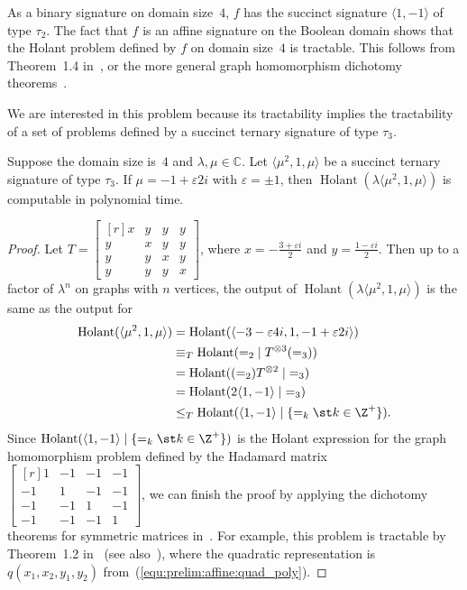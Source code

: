 \documentclass[11pt]{article}
\newcommand{\Holant}{\operatorname{Holant}}
\newcommand{\holant}[2]{\Holant(#1\mid #2)}
\begin{document}
As a binary signature on domain size~$4$,
$f$ has the succinct signature $\langle 1, -1 \rangle$ of type $\tau_2$.
The fact that $f$ is an affine signature on the Boolean domain shows that the Holant problem defined by $f$ on domain size~$4$ is tractable.
This follows from Theorem~1.4 in~\cite{CLX14},
or the more general graph homomorphism dichotomy theorems~\cite{GGJT10,CCL13}.

We are interested in this problem because its tractability implies the tractability of a set of problems defined by a succinct ternary signature of type $\tau_3$.

\begin{lemma} \label{lem:tractable:u^21u}
 Suppose the domain size is~$4$ and $\lambda, \mu \in \mathbb{C}$.
 Let $\langle \mu^2, 1, \mu \rangle$ be a succinct ternary signature of type $\tau_3$.
 If $\mu = -1 + \varepsilon 2 i$ with $\varepsilon = \pm 1$,
 then $\Holant(\lambda \langle \mu^2, 1, \mu \rangle)$ is computable in polynomial time.
\end{lemma}

\begin{proof}
 Let $T = \left[\begin{smallmatrix*}[r] x & y & y & y \\ y & x & y & y \\ y & y & x & y \\ y & y & y & x \end{smallmatrix*}\right]$,
 where $x = -\frac{3 + \varepsilon i}{2}$ and $y = \frac{1 - \varepsilon i}{2}$.
 Then up to a factor of $\lambda^n$ on graphs with $n$ vertices,
 the output of $\Holant(\lambda \langle \mu^2, 1, \mu \rangle)$ is the same as the output for
 \begin{align*}
  \Holant(\langle \mu^2, 1, \mu \rangle)
  &= \Holant(\langle -3 - \varepsilon 4 i, 1, -1 + \varepsilon 2 i \rangle)\\
  &\equiv_T \holant{{=}_2}{T^{\otimes 3} ({=}_3)}\\
  &= \holant{({=}_2) T^{\otimes 2}}{{=}_3}\\
  &= \holant{2 \langle 1,-1 \rangle}{{=}_3}\\
  &\le_T \holant{\langle 1,-1 \rangle}{\{=_k \st k \in \Z^+\}}.
 \end{align*}
 Since $\holant{\langle 1,-1 \rangle}{\{=_k \st k \in \Z^+\}}$ is the Holant expression
 for the graph homomorphism problem defined by the Hadamard matrix
 $\left[\begin{smallmatrix*}[r] 1 & -1 & -1 & -1 \\ -1 & 1 & -1 & -1 \\ -1 & -1 & 1 & -1 \\ -1 & -1 & -1 & 1 \end{smallmatrix*}\right]$,
 we can finish the proof by applying the dichotomy theorems for symmetric matrices in~\cite{GGJT10,CCL13}.
 For example,
 this problem is tractable by Theorem~1.2 in~\cite{GGJT10} (see also~\cite{CLX14}),
 where the quadratic representation is $q(x_1, x_2, y_1, y_2)$ from~(\ref{equ:prelim:affine:quad_poly}).
\end{proof}
\end{document}
